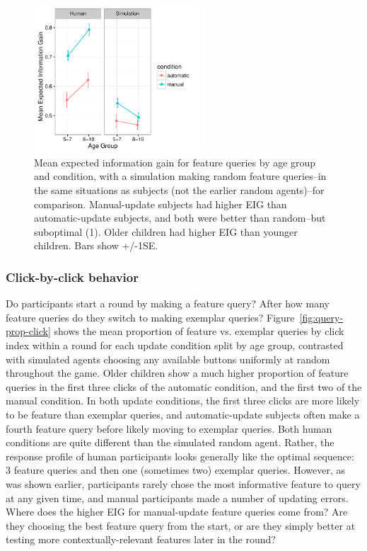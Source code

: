 \documentclass[man,floatsintext]{apa6}
\begin{document}
\begin{figure}[t]
  \centering
  \includegraphics[width=0.55\textwidth]{figures/EIG_by_ageGroup_n_condition_with_random_sims}
  \caption{Mean expected information gain for feature queries by age group and condition, 
with a simulation making random feature queries--in the same situations as subjects (not the earlier random agents)--for comparison. Manual-update subjects had higher EIG than automatic-update subjects, and both were better than random--but suboptimal (1). Older children had higher EIG than younger children. Bars show +/-1SE.}
  \label{fig:EIG_by_age}
\end{figure} 

\subsubsection{Click-by-click behavior}

Do participants start a round by making a feature query? After how many feature 
queries do they switch to making exemplar queries? Figure~\ref{fig:query-prop-click} shows the mean proportion of feature vs. exemplar queries by click index within a round for each update condition split by age group, contrasted with simulated agents choosing any available buttons uniformly at random throughout the game. Older children show a much higher proportion of feature queries in the first three clicks of the automatic condition, and the first two of the manual condition. In both update conditions, the first three clicks are more likely to be feature than exemplar queries, and automatic-update subjects often make a fourth feature query before likely moving to exemplar queries. 
Both human conditions are quite different than the simulated random agent. 
Rather, the response profile of human participants looks generally like the optimal sequence: 3 feature queries and then one (sometimes two) exemplar queries. However, as was shown earlier, participants rarely chose the most informative feature to query at any given time, and manual participants made a number of updating errors. Where does the higher EIG for manual-update feature queries come from? Are they choosing the best feature query from the start, or are they simply better at testing more contextually-relevant features later in the round?
\end{document}
